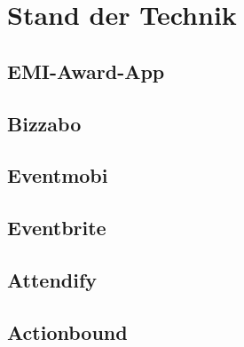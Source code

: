 \chapter{Stand der Technik}

\section{EMI-Award-App}



\section{Bizzabo}

\section{Eventmobi}

\section{Eventbrite}

\section{Attendify}

\section{Actionbound}